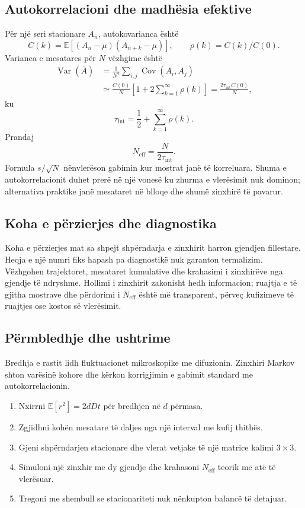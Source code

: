 \documentclass[11pt,oneside,openany]{book}
\newcommand{\E}{\mathbb{E}}
\newcommand{\Var}{\operatorname{Var}}
\newcommand{\Cov}{\operatorname{Cov}}
\begin{document}
\subsection{Autokorrelacioni dhe madhësia efektive}
Për një seri stacionare $A_n$, autokovarianca është
\begin{equation}
 C(k)=\E[(A_n-\mu)(A_{n+k}-\mu)],
 \qquad \rho(k)=C(k)/C(0).
\end{equation}
Varianca e mesatares për $N$ vëzhgime është
\begin{align}
 \Var(\overline A)&=\frac{1}{N^2}\sum_{i,j}\Cov(A_i,A_j)\\
 &\simeq\frac{C(0)}{N}\left[1+2\sum_{k=1}^{\infty}\rho(k)\right]
 =\frac{2\tau_{\mathrm{int}}C(0)}{N},
\end{align}
ku
\begin{equation}
 \tau_{\mathrm{int}}=\frac12+\sum_{k=1}^{\infty}\rho(k).
\end{equation}
Prandaj
\begin{equation}
 N_{\mathrm{eff}}=\frac{N}{2\tau_{\mathrm{int}}}.
\end{equation}
Formula $s/\sqrt N$ nënvlerëson gabimin kur mostrat janë të korreluara. Shuma e autokorrelacionit duhet prerë në një vonesë ku zhurma e vlerësimit nuk dominon; alternativa praktike janë mesataret në blloqe dhe shumë zinxhirë të pavarur.

\subsection{Koha e përzierjes dhe diagnostika}
Koha e përzierjes mat sa shpejt shpërndarja e zinxhirit harron gjendjen fillestare. Heqja e një numri fiks hapash pa diagnostikë nuk garanton termalizim. Vëzhgohen trajektoret, mesataret kumulative dhe krahasimi i zinxhirëve nga gjendje të ndryshme. Hollimi i zinxhirit zakonisht hedh informacion; ruajtja e të gjitha mostrave dhe përdorimi i $N_{\mathrm{eff}}$ është më transparent, përveç kufizimeve të ruajtjes ose kostos së vlerësimit.

\subsection{Përmbledhje dhe ushtrime}
Bredhja e rastit lidh fluktuacionet mikroskopike me difuzionin. Zinxhiri Markov shton varësinë kohore dhe kërkon korrigjimin e gabimit standard me autokorrelacionin.
\begin{enumerate}
\item Nxirrni $\E[r^2]=2dDt$ për bredhjen në $d$ përmasa.
\item Zgjidhni kohën mesatare të daljes nga një interval me kufij thithës.
\item Gjeni shpërndarjen stacionare dhe vlerat vetjake të një matrice kalimi $3\times3$.
\item Simuloni një zinxhir me dy gjendje dhe krahasoni $N_{\mathrm{eff}}$ teorik me atë të vlerësuar.
\item Tregoni me shembull se stacionariteti nuk nënkupton balancë të detajuar.
\end{enumerate}
\end{document}
